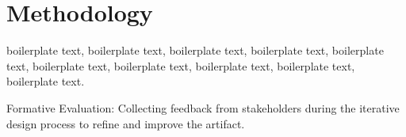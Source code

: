 \chapter{Methodology}


boilerplate text, boilerplate text, boilerplate text, boilerplate text, boilerplate text, boilerplate text, boilerplate text, boilerplate text, boilerplate text, boilerplate text.



Formative Evaluation: Collecting feedback from stakeholders during the iterative design process to refine and improve the artifact.